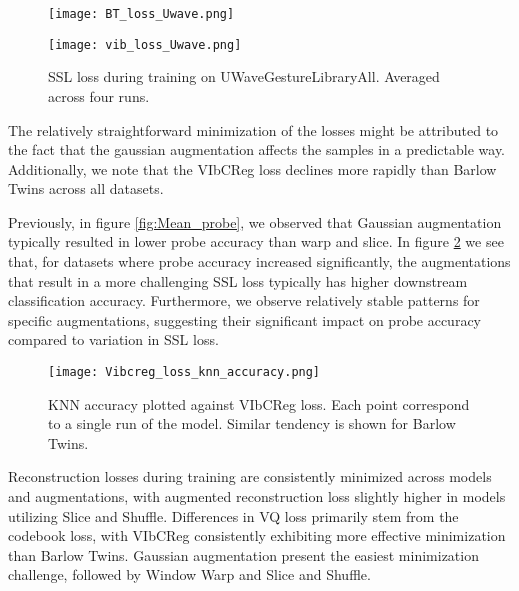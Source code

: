 \documentclass[../../thesis.tex]{subfiles}
\begin{document}
\begin{figure}[h]
    \centering
    \begin{minipage}[b]{0.49\textwidth}
        \centering
        \texttt{[image: BT\_loss\_Uwave.png]}
    \end{minipage}
    \hfill
    \begin{minipage}[b]{0.49\textwidth}
        \centering
        \texttt{[image: vib\_loss\_Uwave.png]}
    \end{minipage}
    \caption{SSL loss during training on UWaveGestureLibraryAll. Averaged across four runs.}
    \label{fig:SSL_loss_UWave}
\end{figure}

The relatively straightforward minimization of the losses might be attributed to the fact that the gaussian augmentation affects the samples in a predictable way. Additionally, we note that the VIbCReg loss declines more rapidly than Barlow Twins across all datasets. \newline

Previously, in figure \ref{fig:Mean_probe}, we observed that Gaussian augmentation typically resulted in lower probe accuracy than warp and slice. In figure \ref{fig:Vibcreg_loss_knn_accuracy} we see that, for datasets where probe accuracy increased significantly, the augmentations that result in a more challenging SSL loss typically has higher downstream classification accuracy. Furthermore, we observe relatively stable patterns for specific augmentations, suggesting their significant impact on probe accuracy compared to variation in SSL loss.\newline

\begin{figure}[h]
    \texttt{[image: Vibcreg\_loss\_knn\_accuracy.png]}
    \centering  
    \caption{KNN accuracy plotted against VIbCReg loss. Each point correspond to a single run of the model. Similar tendency is shown for Barlow Twins.}
    \label{fig:Vibcreg_loss_knn_accuracy}
\end{figure}

Reconstruction losses during training are consistently minimized across models and augmentations, with augmented reconstruction loss slightly higher in models utilizing Slice and Shuffle. Differences in VQ loss primarily stem from the codebook loss, with VIbCReg consistently exhibiting more effective minimization than Barlow Twins. Gaussian augmentation present the easiest minimization challenge, followed by Window Warp and Slice and Shuffle.\newline
\end{document}
